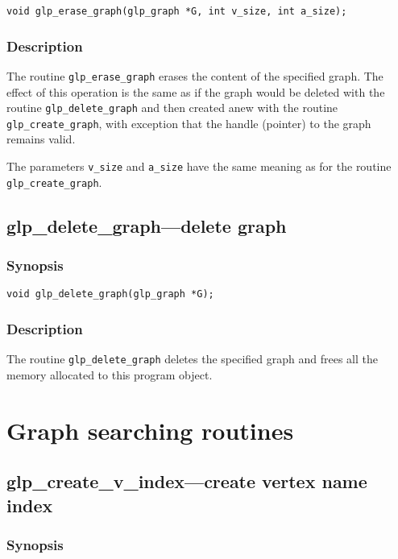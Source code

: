 \documentclass[dvipdfm,11pt]{report}
\begin{document}
\begin{verbatim}
void glp_erase_graph(glp_graph *G, int v_size, int a_size);
\end{verbatim}

\subsubsection*{Description}

The routine \verb|glp_erase_graph| erases the content of the specified
graph. The effect of this operation is the same as if the graph would be
deleted with the routine \verb|glp_delete_graph| and then created anew
with the routine \verb|glp_create_graph|, with exception that the handle
(pointer) to the graph remains valid.

The parameters \verb|v_size| and \verb|a_size| have the same meaning as
for the routine \verb|glp_create_graph|.

\subsection{glp\_delete\_graph---delete graph}

\subsubsection*{Synopsis}

\begin{verbatim}
void glp_delete_graph(glp_graph *G);
\end{verbatim}

\subsubsection*{Description}

The routine \verb|glp_delete_graph| deletes the specified graph and
frees all the memory allocated to this program object.

\newpage

\section{Graph searching routines}

\subsection{glp\_create\_v\_index---create vertex name index}

\subsubsection*{Synopsis}
\end{document}
